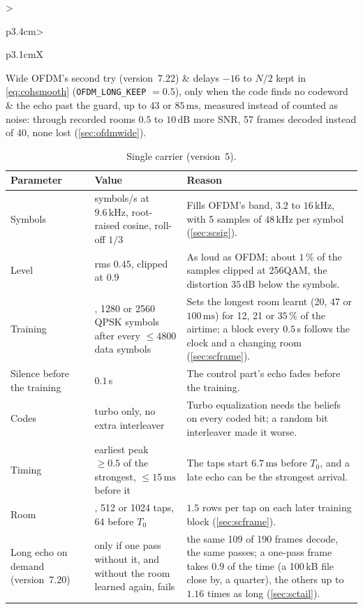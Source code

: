 \documentclass[11pt,a4paper]{article}
\newcommand{\kHz}{\,\mathrm{kHz}}
\newcommand{\ms}{\,\mathrm{ms}}
\newcommand{\dB}{\,\mathrm{dB}}
\newcommand{\code}[1]{\texttt{#1}}
\theoremstyle{remark}
\begin{document}
\begin{table}[ht]
\begin{tabularx}{\linewidth}{>{\raggedright\arraybackslash}p{3.4cm}>{\raggedright\arraybackslash}p{3.1cm}X}
Wide OFDM's second try (version~7.22) & delays $-16$ to $N/2$ kept in \cref{eq:cohsmooth} (\code{OFDM\_LONG\_KEEP} $= 0.5$), only when the code finds no codeword & the echo past the guard, up to 43 or $85\ms$, measured instead of counted as noise: through recorded rooms $0.5$ to $10\dB$ more SNR, 57 frames decoded instead of 40, none lost (\cref{sec:ofdmwide}).\\
\bottomrule
\end{tabularx}
\end{table}

\begin{table}[ht]
\centering
\caption{Single carrier (version~5).}
\label{tab:psc}
\small
\begin{tabularx}{\linewidth}{>{\raggedright\arraybackslash}p{3.4cm}>{\raggedright\arraybackslash}p{3.1cm}X}
\toprule
Parameter & Value & Reason\\
\midrule
Symbols & 9600 symbols/s at $9.6\kHz$, root-raised cosine, roll-off $1/3$ & Fills OFDM's band, $3.2$ to $16\kHz$, with 5 samples of $48\kHz$ per symbol (\cref{sec:scsig}).\\
Level & rms $0.45$, clipped at $0.9$ & As loud as OFDM; about $1\,\%$ of the samples clipped at 256QAM, the distortion $35\dB$ below the symbols.\\
Training & 640, 1280 or 2560 QPSK symbols after every $\le 4800$ data symbols & Sets the longest room learnt (20, 47 or $100\ms$) for 12, 21 or $35\,\%$ of the airtime; a block every $0.5$\,s follows the clock and a changing room (\cref{sec:scframe}).\\
Silence before the training & $0.1$\,s & The control part's echo fades before the training.\\
Codes & turbo only, no extra interleaver & Turbo equalization needs the beliefs on every coded bit; a random bit interleaver made it worse.\\
Timing & earliest peak $\ge 0.5$ of the strongest, $\le 15\ms$ before it & The taps start $6.7\ms$ before $T_0$, and a late echo can be the strongest arrival.\\
Room & 256, 512 or 1024 taps, 64 before $T_0$ & $1.5$ rows per tap on each later training block (\cref{sec:scframe}).\\
Long echo on demand (version~7.20) & only if one pass without it, and without the room learned again, fails & the same 109 of 190 frames decode, the same passes; a one-pass frame takes $0.9$ of the time (a 100\,kB file close by, a quarter), the others up to $1.16$ times as long (\cref{sec:sctail}).\\

\end{tabularx}
\end{table}
\end{document}
